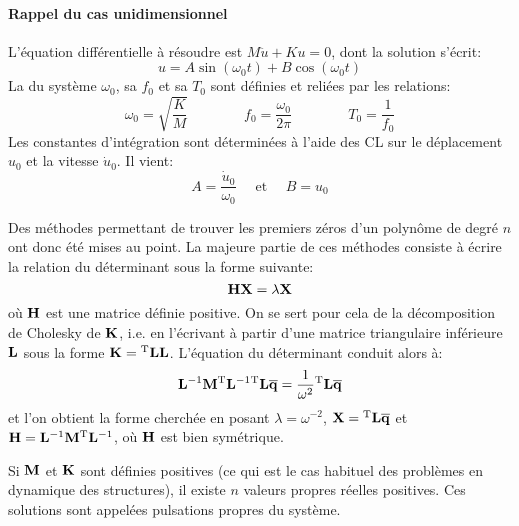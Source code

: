 \paragraph{Rappel du cas unidimensionnel}
L'équation différentielle à résoudre est $M\ddot{u}+Ku=0$,
dont la solution s'écrit: \begin{equation} u=A\sin (\omega_0 t)+B\cos(\omega_0 t) \end{equation}
La  du système $\omega_0$, sa  $f_0$ et sa  $T_0$ sont définies et reliées par les relations:
\begin{equation}
\omega_0=\sqrt{\dfrac{K}M} \qquad\qquad f_0=\dfrac{\omega_0}{2\pi} \qquad\qquad T_0=\dfrac1{f_0}
\end{equation}
Les constantes d'intégration sont déterminées à l'aide des CL sur le déplacement $u_0$ et la
vitesse $\dot{u}_0$. Il vient: \begin{equation} A=\frac{\dot{u}_0}{\omega_0} \quad\text{ et }\quad B=u_0\end{equation}

\medskip{}
Des méthodes permettant de trouver les premiers zéros d'un polynôme de degré $n$ ont donc été
mises au point.
La majeure partie de ces méthodes consiste à écrire la relation du déterminant sous la forme suivante:
\begin{equation} \MM{H}\VV{X}=\lambda\VV{X} \end{equation}
où $\MM{H}$ est une matrice définie positive.
\medskipvm
On se sert pour cela de la décomposition de Cholesky
de $\MM{K}$, i.e. en l'écrivant à partir d'une matrice triangulaire inférieure $\MM{L}$ sous la forme $\MM{K}=\MMT{L}\MM{L}$.
\medskipvm
L'équation du déterminant conduit alors à:
\begin{equation} \MMI{L}\MM{M}\MMIT{L}\MMT{L}\VV{\overline{q}}=\frac1{\omega^2}\MMT{L}\VV{\overline{q}} \end{equation}
et l'on obtient la forme cherchée en posant $\lambda=\omega^{-2}$, $\VV{X}=\MMT{L}\VV{\overline{q}}$
et $\MM{H}=\MMI{L}\MM{M}\MMIT{L}$, où $\MM{H}$ est bien symétrique.

\medskip
{}
Si $\MM{M}$ et $\MM{K}$ sont définies positives (ce qui est le cas habituel des problèmes en dynamique
des structures), il existe $n$ valeurs propres réelles positives. Ces solutions sont appelées
pulsations propres du système.


